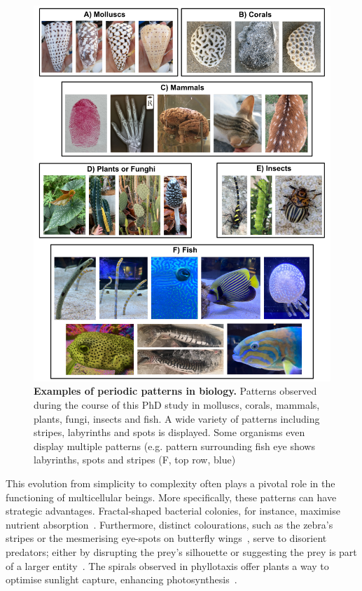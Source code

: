\begin{figure}[h!]
    \centering
    \includegraphics[width=1\textwidth]{chapters/Introduction/pattern_examples}
    \caption{\textbf{Examples of periodic patterns in biology.} Patterns observed during the course of this PhD study in molluscs, corals, mammals, plants, fungi, insects and fish. A wide variety of patterns including stripes, labyrinths and spots is displayed. Some organisms even display multiple patterns (e.g. pattern surrounding fish eye shows labyrinths, spots and stripes (F, top row, blue)}
    \label{fig:pattern_examples}
\end{figure}
This evolution from simplicity to complexity often plays a pivotal role in the functioning of multicellular beings.
More specifically, these patterns can have strategic advantages.
Fractal-shaped bacterial colonies, for instance, maximise nutrient absorption~\parencite{Matsushita1990}.
Furthermore, distinct colourations, such as the zebra's stripes or the mesmerising eye-spots on butterfly wings~\parencite{Blest}, serve to disorient predators; either by disrupting the prey's silhouette or suggesting the prey is part of a larger entity~\parencite{Stevens2006}.
The spirals observed in phyllotaxis offer plants a way to optimise sunlight capture, enhancing photosynthesis~\parencite{Strauss2020}.

